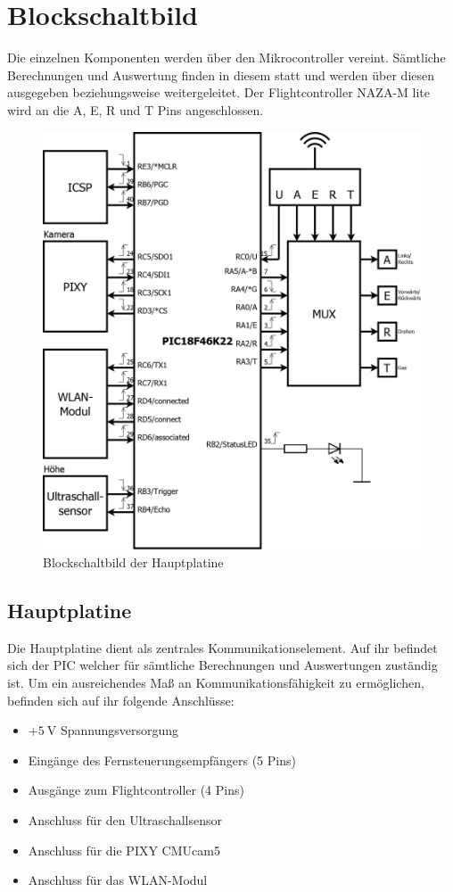 \section{Blockschaltbild}
Die einzelnen Komponenten werden über den Mikrocontroller vereint. Sämtliche Berechnungen und Auswertung finden in diesem statt und werden über diesen ausgegeben beziehungsweise
weitergeleitet. Der Flightcontroller NAZA-M lite wird an die A, E, R und T Pins angeschlossen.
\begin{figure}[H]
  \begin{centering}
    \includegraphics[width = 1\textwidth]{Bilder/Blockschaltbild}
  \par\end{centering}
  \caption{Blockschaltbild der Hauptplatine}
  \label{Blockschaltbild}
\end{figure}

  \subsection{Hauptplatine}
  Die Hauptplatine dient als zentrales Kommunikationselement. Auf ihr befindet sich der PIC welcher für sämtliche Berechnungen und Auswertungen zuständig ist.
  Um ein ausreichendes Maß an Kommunikationsfähigkeit zu ermöglichen, befinden sich auf ihr folgende Anschlüsse:
  \begin{itemize}
    \item $+\SI{5}{\volt}$ Spannungsversorgung
    \item Eingänge des Fernsteuerungsempfängers (5 Pins)
    \item Ausgänge zum Flightcontroller (4 Pins)
    \item Anschluss für den Ultraschallsensor
    \item Anschluss für die PIXY CMUcam5
    \item Anschluss für das WLAN-Modul
  \end{itemize}

